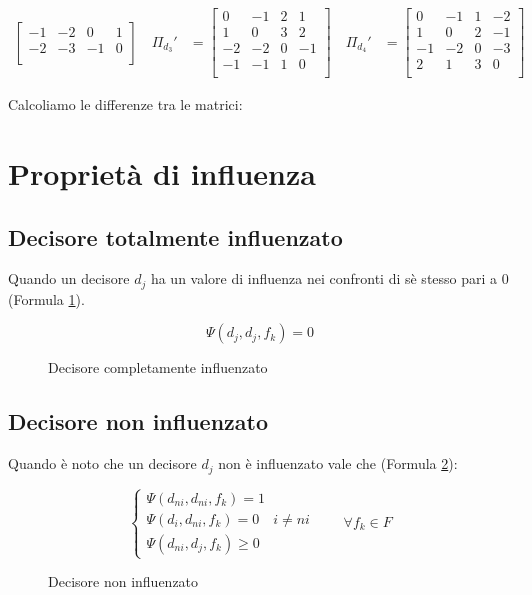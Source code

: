 \documentclass[\main/main.tex]{subfiles}
\begin{document}
\begin{align*}
\begin{bmatrix}
		-1 & -2 & 0  & 1 \\
		-2 & -3 & -1 & 0 \\
	\end{bmatrix}
	\quad
	\Pi_{d_3}' & = \begin{bmatrix}
		0  & -1 & 2 & 1  \\
		1  & 0  & 3 & 2  \\
		-2 & -2 & 0 & -1 \\
		-1 & -1 & 1 & 0  \\
	\end{bmatrix}
	\quad
	\Pi_{d_4}' & = \begin{bmatrix}
		0  & -1 & 1 & -2 \\
		1  & 0  & 2 & -1 \\
		-1 & -2 & 0 & -3 \\
		2  & 1  & 3 & 0  \\
	\end{bmatrix}
\end{align*}

Calcoliamo le differenze tra le matrici:

\clearpage

\section{Proprietà di influenza}
\subsection{Decisore totalmente influenzato}
Quando un decisore $d_j$ ha un valore di influenza nei confronti di sè stesso pari a 0 (Formula \ref{decisore_influenzato}).

\begin{figure}
	\[
		\Psi(d_j, d_j, f_k) = 0
	\]
	\caption{Decisore completamente influenzato}
	\label{decisore_influenzato}
\end{figure}

\subsection{Decisore non influenzato}
Quando è noto che un decisore $d_j$ non è influenzato vale che (Formula \ref{decisore_non_influenzato}):

\begin{figure}
	\[
		\begin{cases}
			\Psi(d_{ni}, d_{ni}, f_k) = 1             \\
			\Psi(d_i, d_{ni}, f_k) = 0 \quad i\neq ni \\
			\Psi(d_{ni}, d_j, f_k) \geq 0
		\end{cases}
		\qquad \forall f_k \in F
	\]
	\caption{Decisore non influenzato}
	\label{decisore_non_influenzato}
\end{figure}
\end{document}
